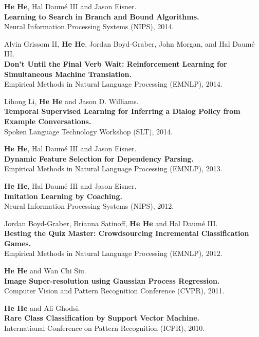 \documentclass[margin,line]{resume}
\begin{document}
\begin{resume}
{\bf He He}, Hal Daum\'e III and Jason Eisner. \\
{\bf Learning to Search in Branch and Bound Algorithms.}\\
Neural Information Processing Systems (NIPS), 2014.%

Alvin Grissom II, {\bf He He}, Jordan Boyd-Graber, John Morgan, and Hal Daum\'e III. \\
{\bf Don't Until the Final Verb Wait: Reinforcement Learning for Simultaneous Machine Translation.}\\
Empirical Methods in Natural Language Processing (EMNLP), 2014.%

Lihong Li, {\bf He He} and Jason D. Williams. \\
{\bf Temporal Supervised Learning for Inferring a Dialog Policy from Example Conversations.}\\
Spoken Language Technology Workshop (SLT), 2014.%

{\bf He He}, Hal Daum\'e III and Jason Eisner.\\
{\bf Dynamic Feature Selection for Dependency Parsing.}\\ 
Empirical Methods in Natural Language Processing (EMNLP), 2013.%

{\bf He He}, Hal Daum\'e III and Jason Eisner.\\
{\bf Imitation Learning by Coaching.}\\ 
Neural Information Processing Systems (NIPS), 2012.%

Jordan Boyd-Graber, Brianna Satinoff, {\bf He He} and Hal Daum\'e III.\\
{\bf Besting the Quiz Master: Crowdsourcing Incremental Classification Games.}\\
Empirical Methods in Natural Language Processing (EMNLP), 2012.%

{\bf He He} and Wan Chi Siu. \\
{\bf Image Super-resolution using Gaussian Process Regression.}\\
Computer Vision and Pattern Recognition Conference (CVPR), 2011.%

{\bf He He} and Ali Ghodsi. \\
{\bf Rare Class Classification by Support Vector Machine.}\\
International Conference on Pattern Recognition (ICPR), 2010.


\end{resume}
\end{document}
